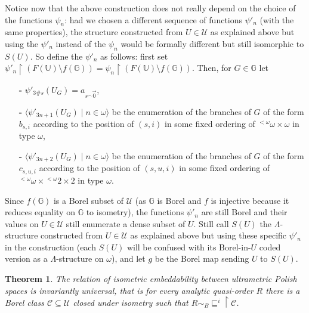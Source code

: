 \documentclass{amsart}
\newtheorem{theorem}{Theorem}[section]
\theoremstyle{definition}
\theoremstyle{remark}
\begin{document}
Notice now that the above construction does not really depend on the
choice of the functions $\psi_n$: had we chosen a different sequence
of functions $\psi'_n$ (with the same properties), the structure
constructed from $U \in \mathcal{U}$ as explained above but using the
$\psi'_n$ instead of the $\psi_n$ would be formally different but
still isomorphic to $S(U)$. So define the $\psi'_n$ as follows: first set $\psi'_n \restriction (F(\mathbb{U}) \setminus f({\mathbb{G}}))= \psi_n
\restriction (F(\mathbb{U}) \setminus f({\mathbb{G}}))$.
Then, for $G \in {\mathbb{G}}$ let
\begin{itemize}
\item[{\bf -}] $\psi'_{3 \# s}(U_G) = a_{s {}^\smallfrown \vec{0}}$,
\item[{\bf -}] $\langle \psi'_{3n +
  1}(U_G) \mid n \in \omega \rangle$ be the enumeration of the branches of $G$ of the form $b_{s ,i}$ according to the position of $(s,i)$ in some fixed ordering of ${ }^{<\omega }\omega\times\omega $ in type $\omega $,
\item[{\bf -}] $\langle \psi'_{3n+2}(U_G)\mid n \in
\omega \rangle$ be the enumeration of the branches of $G$ of the form
$c_{s,u,i}$ according to the position of $(s,u,i)$ in some fixed ordering of ${ }^{<\omega }\omega\times{ }^{<\omega }2\times 2$ in type $\omega $.
\end{itemize}
Since $f({\mathbb{G}})$ is a Borel subset
of $\mathcal{U}$ (as ${\mathbb{G}}$ is Borel and $f$ is injective because it reduces
equality on ${\mathbb{G}}$ to isometry), the
functions $\psi'_n$ are still Borel and their values on $U \in \mathcal{U}$
still enumerate a dense subset of $U$. Still call $S(U)$ the $\Lambda $-structure
constructed from $U \in \mathcal{U}$ as explained above but using these
specific $\psi'_n$ in the construction (each $S(U)$ will be confused
with its Borel-in-$U$ coded version as a $\Lambda $-structure on
$\omega$), and let $g$ be the Borel map sending $U$ to $S(U)$.

\begin{theorem}\label{theorultrametric}
The relation of isometric embeddability between ultrametric Polish
spaces is invariantly universal, that is for every analytic
quasi-order $R$ there is a Borel class $\mathcal{C} \subseteq \mathcal{U}$
closed under isometry such that $R \sim_B {{\sqsubseteq^i}
  \restriction \mathcal{C}}$.
\end{theorem}
\end{document}
